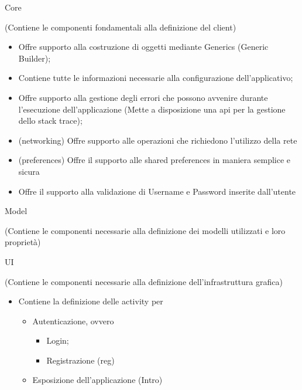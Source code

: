   \begin{minipage}{0.45\textwidth}
    \begin{center}
      {\Huge Core}

      (Contiene le componenti fondamentali alla definizione del client)
    \end{center}
    \vspace{0.5cm}

    \begin{itemize}
      \setlength\itemsep{1em}
    \item {} \rightarrow Offre supporto alla costruzione di oggetti mediante Generics (Generic Builder);
    \item {} \rightarrow Contiene tutte le informazioni necessarie alla configurazione dell'applicativo;
    \item {} \rightarrow Offre supporto alla gestione degli errori che possono avvenire durante l'esecuzione dell'applicazione (Mette a disposizione una api per la gestione dello stack trace);
    \item {} (networking) \rightarrow Offre supporto alle operazioni che richiedono l'utilizzo della rete
    \item {} (preferences) \rightarrow Offre il supporto alle shared preferences in maniera semplice e sicura
    \item {} \rightarrow Offre il supporto alla validazione di Username e Password inserite dall'utente
    \end{itemize}

    \vspace{1cm}

    \begin{center}
      {\Huge Model}

      (Contiene le componenti necessarie alla definizione dei modelli utilizzati e loro proprietà)
    \end{center}
    \vspace{0.5cm}

    \begin{center}
      {\Huge UI}

      (Contiene le componenti necessarie alla definizione dell’infrastruttura grafica)
    \end{center}
    \vspace{0.5cm}

    \begin{itemize}
      \setlength\itemsep{1em}
    \item {} \rightarrow Contiene la definizione delle activity \footnotemark per \begin{itemize} \item Autenticazione, ovvero \begin{itemize} \item Login; \item Registrazione (reg) \end{itemize} \item Esposizione dell'applicazione (Intro) \end{itemize}


\end{itemize}
\end{minipage}
